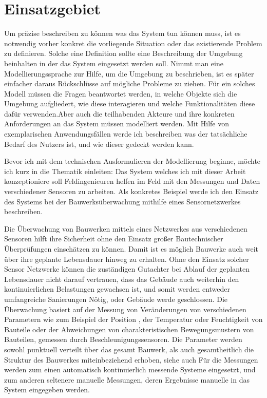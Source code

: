 \section{Einsatzgebiet}
Um präzise beschreiben zu können was das System tun können muss, ist es notwendig vorher konkret die vorliegende Situation oder das existierende Problem zu definieren. Solche eine Definition sollte eine Beschreibung der Umgebung beinhalten in der das System eingesetzt werden soll. Nimmt man eine Modellierungssprache zur Hilfe, um die Umgebung zu beschrieben, ist es später einfacher daraus Rückschlüsse auf mögliche Probleme zu ziehen. Für ein solches Modell müssen die Fragen beantwortet werden, in welche Objekte sich die Umgebung aufgliedert, wie diese interagieren und welche Funktionalitäten diese dafür verwenden.Aber auch die teilhabenden Akteure und ihre konkreten Anforderungen an das System müssen modelliert werden. Mit Hilfe von exemplarischen Anwendungsfällen werde ich beschreiben was der tatsächliche Bedarf des Nutzers ist, und wie dieser gedeckt werden kann.

Bevor ich mit dem technischen Ausformulieren der Modellierung beginne, möchte ich kurz in die Thematik einleiten: Das System welches ich mit dieser Arbeit konzeptioniere soll Feldingenieuren helfen im Feld mit den Messungen und Daten verschiedener Sensoren zu arbeiten. Als konkretes Beispiel werde ich den Einsatz des Systems bei der Bauwerksüberwachung mithilfe eines Sensornetzwerkes beschreiben.

Die Überwachung von Bauwerken mittels eines Netzwerkes aus verschiedenen Sensoren hilft ihre Sicherheit ohne den Einsatz großer Bautechnischer Überprüfungen einschätzen zu können. Damit ist es möglich Bauwerke auch weit über ihre geplante Lebensdauer hinweg zu erhalten. Ohne den Einsatz solcher Sensor Netzwerke können die zuständigen Gutachter bei Ablauf der geplanten Lebensdauer nicht darauf vertrauen, dass das Gebäude auch weiterhin den kontinuierlichen Belastungen gewachsen ist, und somit werden entweder umfangreiche Sanierungen Nötig, oder Gebäude werde geschlossen. Die Überwachung basiert auf der Messung von Veränderungen von verschiedenen Parametern wie zum Beispiel der Position , der Temperatur oder Feuchtigkeit von Bauteile oder der Abweichungen von charakteristischen Bewegungsmustern von Bauteilen, gemessen durch Beschleunigungssensoren. Die Parameter werden sowohl punktuell  verteilt über das gesamt Bauwerk, als auch gesamtheitlich die Struktur des Bauwerkes miteinbeziehend erhoben, siehe auch \citep{farrar_introduction_2007} \citep{worden_overview_2004} \citep{boller_structural_2004}Für die Messungen werden zum einen automatisch kontinuierlich messende Systeme eingesetzt, und zum anderen seltenere manuelle Messungen, deren Ergebnisse manuelle in das System eingegeben werden. 


